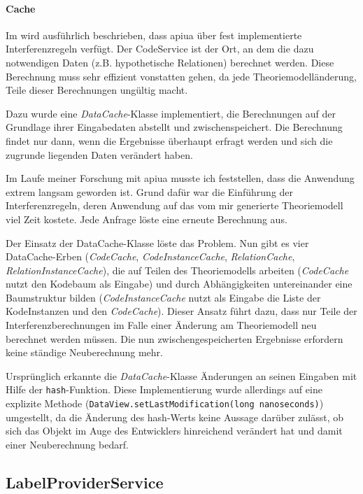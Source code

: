 \paragraph{Cache}

Im  wird ausführlich beschrieben, dass \gls{apiua} über fest implementierte Interferenzregeln verfügt. Der CodeService ist der Ort, an dem die dazu notwendigen Daten (z.B. hypothetische Relationen) berechnet werden. Diese Berechnung muss sehr effizient vonstatten gehen, da jede Theoriemodelländerung, Teile dieser Berechnungen ungültig macht.

Dazu wurde eine \textit{DataCache}-Klasse implementiert, die Berechnungen auf der Grundlage ihrer Eingabedaten abstellt und zwischenspeichert. Die Berechnung findet nur dann, wenn die Ergebnisse überhaupt erfragt werden und sich die zugrunde liegenden Daten verändert haben.

Im Laufe meiner Forschung mit \gls{apiua} musste ich feststellen, dass die Anwendung extrem langsam geworden ist. Grund dafür war die Einführung der Interferenzregeln, deren Anwendung auf das vom mir generierte Theoriemodell viel Zeit kostete. Jede Anfrage löste eine erneute Berechnung aus.

Der Einsatz der DataCache-Klasse löste das Problem. Nun gibt es vier DataCache-Erben (\textit{CodeCache}, \textit{CodeInstanceCache}, \textit{RelationCache}, \textit{RelationInstanceCache}), die auf Teilen des Theoriemodells arbeiten (\textit{CodeCache} nutzt den Kodebaum als Eingabe) und durch Abhängigkeiten untereinander eine Baumstruktur bilden (\textit{CodeInstanceCache} nutzt als Eingabe die Liste der KodeInstanzen und den \textit{CodeCache}). Dieser Ansatz führt dazu, dass nur Teile der Interferenzberechnungen im Falle einer Änderung am Theoriemodell neu berechnet werden müssen. Die nun zwischengespeicherten Ergebnisse erfordern keine ständige Neuberechnung mehr.

Ursprünglich erkannte die \textit{DataCache}-Klasse Änderungen an seinen Eingaben mit Hilfe der \texttt{hash}-Funktion. Diese Implementierung wurde allerdings auf eine explizite Methode (\texttt{DataView.setLastModification(long nanoseconds)}) umgestellt, da die Änderung des hash-Werts keine Aussage darüber zulässt, ob sich das Objekt im Auge des Entwicklers hinreichend verändert hat und damit einer Neuberechnung bedarf.



\subsection*{LabelProviderService}

